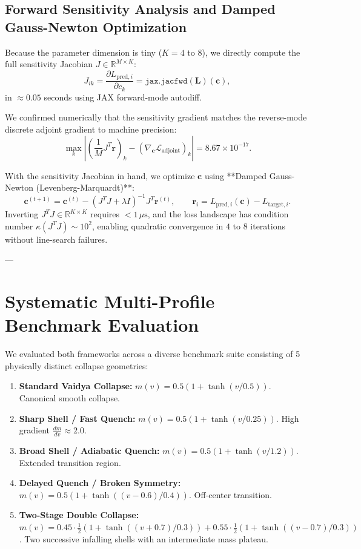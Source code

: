 \documentclass[11pt,a4paper]{article}
\begin{document}
\subsection{Forward Sensitivity Analysis and Damped Gauss-Newton Optimization}
Because the parameter dimension is tiny ($K = 4$ to $8$), we directly compute the full sensitivity Jacobian $J \in \mathbb{R}^{M \times K}$:
\begin{equation}
    J_{ik} = \frac{\partial L_{\mathrm{pred}, i}}{\partial c_k} = \texttt{jax.jacfwd}(\mathbf{L})(\mathbf{c}),
\end{equation}
in $\approx 0.05$ seconds using JAX forward-mode autodiff.

We confirmed numerically that the sensitivity gradient matches the reverse-mode discrete adjoint gradient to machine precision:
\begin{equation}
    \max_k \left| \left( \frac{1}{M} J^T \mathbf{r} \right)_k - \left( \nabla_\mathbf{c} \mathcal{L}_{\mathrm{adjoint}} \right)_k \right| = 8.67 \times 10^{-17}.
\end{equation}

With the sensitivity Jacobian in hand, we optimize $\mathbf{c}$ using **Damped Gauss-Newton (Levenberg-Marquardt)**:
\begin{equation}
    \mathbf{c}^{(t+1)} = \mathbf{c}^{(t)} - \left( J^T J + \lambda I \right)^{-1} J^T \mathbf{r}^{(t)}, \qquad \mathbf{r}_i = L_{\mathrm{pred}, i}(\mathbf{c}) - L_{\mathrm{target}, i}.
\end{equation}
Inverting $J^T J \in \mathbb{R}^{K \times K}$ requires $< 1\,\mu\mathrm{s}$, and the loss landscape has condition number $\kappa(J^T J) \sim 10^2$, enabling quadratic convergence in $4$ to $8$ iterations without line-search failures.

---

\section{Systematic Multi-Profile Benchmark Evaluation}

We evaluated both frameworks across a diverse benchmark suite consisting of 5 physically distinct collapse geometries:
\begin{enumerate}
    \item \textbf{Standard Vaidya Collapse:} $m(v) = 0.5(1 + \tanh(v / 0.5))$. Canonical smooth collapse.
    \item \textbf{Sharp Shell / Fast Quench:} $m(v) = 0.5(1 + \tanh(v / 0.25))$. High gradient $\frac{dm}{dv} \approx 2.0$.
    \item \textbf{Broad Shell / Adiabatic Quench:} $m(v) = 0.5(1 + \tanh(v / 1.2))$. Extended transition region.
    \item \textbf{Delayed Quench / Broken Symmetry:} $m(v) = 0.5(1 + \tanh((v - 0.6) / 0.4))$. Off-center transition.
    \item \textbf{Two-Stage Double Collapse:} $m(v) = 0.45 \cdot \frac{1}{2}(1 + \tanh((v + 0.7)/0.3)) + 0.55 \cdot \frac{1}{2}(1 + \tanh((v - 0.7)/0.3))$. Two successive infalling shells with an intermediate mass plateau.
\end{enumerate}
\end{document}

